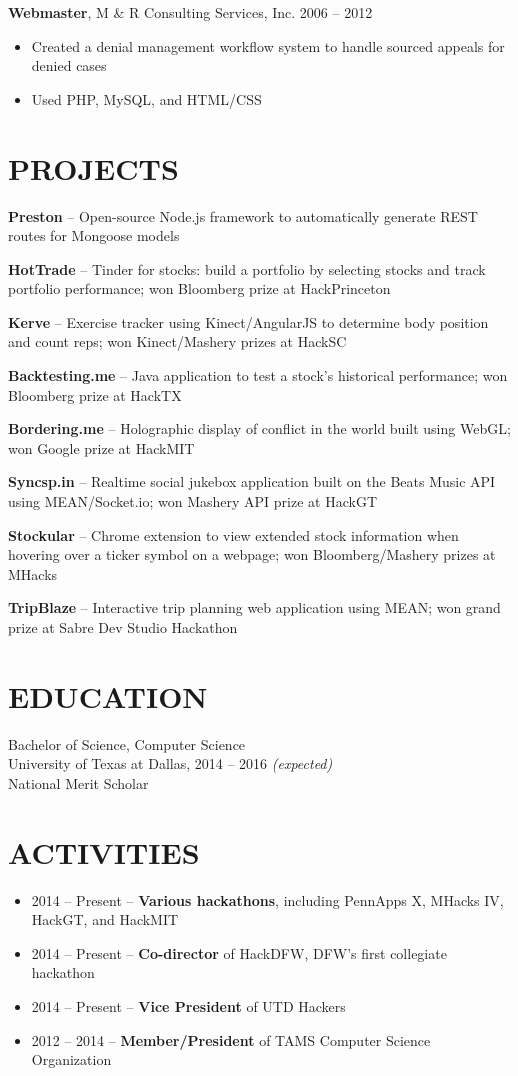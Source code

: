 \documentclass{res} %
\begin{document}
{\bf Webmaster}, M \& R Consulting Services, Inc. \hfill 2006 -- 2012
\begin{itemize} \itemsep -2pt
  \item Created a denial management workflow system to handle sourced appeals for denied cases
  \item Used PHP, MySQL, and HTML/CSS
\end{itemize} 

\section{PROJECTS}

\textbf{Preston} -- Open-source Node.js framework to automatically generate REST routes for Mongoose models

\textbf{HotTrade} -- Tinder for stocks: build a portfolio by selecting stocks and track portfolio performance; won Bloomberg prize at HackPrinceton

\textbf{Kerve} -- Exercise tracker using Kinect/AngularJS to determine body position and count reps; won Kinect/Mashery prizes at HackSC

\textbf{Backtesting.me} -- Java application to test a stock's historical performance; won Bloomberg prize at HackTX

\textbf{Bordering.me} -- Holographic display of conflict in the world built using WebGL; won Google prize at HackMIT

\textbf{Syncsp.in} -- Realtime social jukebox application built on the Beats Music API using MEAN/Socket.io; won Mashery API prize at HackGT

\textbf{Stockular} -- Chrome extension to view extended stock information when hovering over a ticker symbol on a webpage; won Bloomberg/Mashery prizes at MHacks

\textbf{TripBlaze} -- Interactive trip planning web application using MEAN; won grand prize at Sabre Dev Studio Hackathon

\section{EDUCATION}

Bachelor of Science, Computer Science \\
University of Texas at Dallas, 2014 -- 2016 \textit {(expected)} \\
National Merit Scholar

\section{ACTIVITIES} 

\begin{itemize} \itemsep -2pt
  \item 2014 -- Present -- \textbf{Various hackathons}, including PennApps X, MHacks IV, HackGT, and HackMIT
  \item 2014 -- Present -- \textbf{Co-director} of HackDFW, DFW's first collegiate hackathon
  \item 2014 -- Present -- \textbf{Vice President} of UTD Hackers
  \item 2012 -- 2014 -- \textbf{Member/President} of TAMS Computer Science Organization
\end{itemize}
\end{document}
